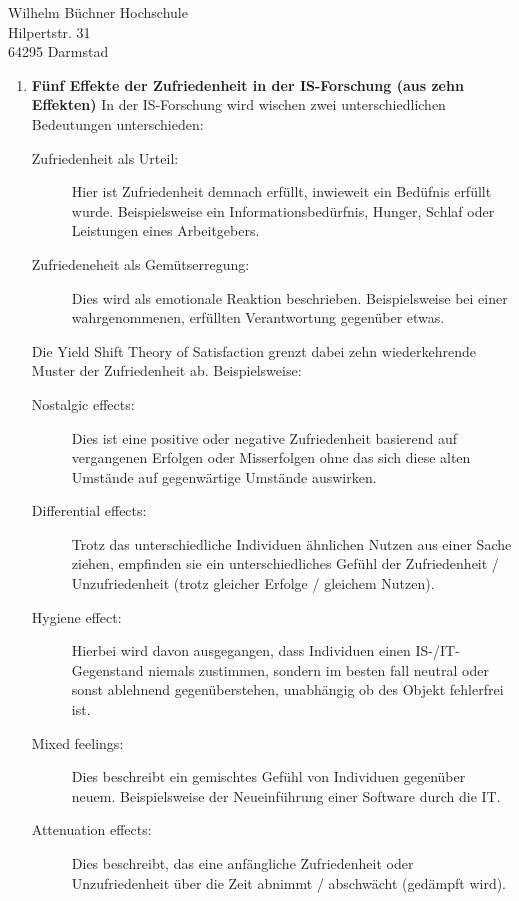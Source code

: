 \documentclass[
    version=last,           %
    DIV=13,                 %
    BCOR=0mm,               %
    paper=a4,               %
    fontsize=12pt,          %
    firsthead=on,           %
    firstfoot=on,           %
    pagenumber=on,i         %
    parskip=half,           %
    enlargefirstpage=,      %
    firsthead=on,           %
    fromrule=afteraddress,  %
    priority=off,           %
    backaddress=true,       %
    refline=dateright,      %
	fromalign=right,	    %
    fromemail=on,i          %
    fromurl=on,             %
    frombank=on,
    fromphone=on,           %
    frommobilephone=on      %
    fromlogo=on,            %
    addrfield=on,           %
    subject=untitled,  %
    foldmarks=off,          %
    numericaldate=off,      %
	pagenumber=right,	        %
	parskip=half,	        %
    headsep=false,          %
    footsepline=true,       %
    foldmarks=off,		    %
	]{scrlttr2}
\begin{document}
\begin{letter} {Wilhelm Büchner Hochschule \\
Hilpertstr. 31\\
64295 Darmstad}
\begin{itemize}
\begin{enumerate}
            \vspace{1cm}
        \item \textbf{Fünf Effekte der Zufriedenheit in der IS-Forschung (aus
            zehn Effekten) }
            In der IS-Forschung wird wischen zwei unterschiedlichen Bedeutungen
            unterschieden:
            \begin{description}
        \item[Zufriedenheit als Urteil:] Hier ist Zufriedenheit demnach erfüllt,
            inwieweit ein Bedüfnis erfüllt wurde. Beispielsweise ein
            Informationsbedürfnis, Hunger, Schlaf oder Leistungen eines
            Arbeitgebers.
        \item [Zufriedeneheit als Gemütserregung:] Dies wird als emotionale
            Reaktion beschrieben. Beispielsweise bei einer wahrgenommenen,
            erfüllten Verantwortung gegenüber etwas.
            \end{description}
            Die Yield Shift Theory of Satisfaction grenzt dabei zehn
            wiederkehrende Muster der Zufriedenheit ab. Beispielsweise:
            \begin{description}
            \item [Nostalgic effects:] Dies ist eine positive oder negative
                Zufriedenheit basierend auf vergangenen Erfolgen oder
                Misserfolgen ohne das sich diese alten Umstände auf
                gegenwärtige Umstände auswirken.
            \item [Differential effects:] Trotz das unterschiedliche Individuen
                ähnlichen Nutzen aus einer Sache ziehen, empfinden sie ein
                unterschiedliches Gefühl der Zufriedenheit / Unzufriedenheit
                (trotz gleicher Erfolge / gleichem Nutzen).
            \item[Hygiene effect:] Hierbei wird davon ausgegangen, dass
                Individuen einen IS-/IT-Gegenstand niemals zustimmen, sondern
                im besten fall neutral oder sonst ablehnend gegenüberstehen,
                unabhängig ob des Objekt fehlerfrei ist.
            \item [Mixed feelings:] Dies beschreibt ein gemischtes Gefühl von
                Individuen gegenüber neuem. Beispielsweise der Neueinführung
                einer Software durch die IT.
            \item [Attenuation effects:] Dies beschreibt, das eine anfängliche
                Zufriedenheit oder Unzufriedenheit über die Zeit abnimmt /
                abschwächt (gedämpft wird).
            \end{description}


\end{enumerate}
\end{itemize}
\end{letter}
\end{document}
